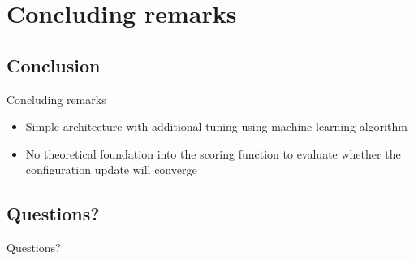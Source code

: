 \section{Concluding remarks}

\subsection{Conclusion}
\begin{frame}{Concluding remarks}
\begin{itemize}
    \item Simple architecture with additional tuning using machine learning algorithm
    \item No theoretical foundation into the scoring function to evaluate whether the configuration update will converge
\end{itemize}
\end{frame}

\subsection{Questions?}
\begin{frame}[label=questions]
Questions?

  \hyperlink{additional}{}
\end{frame}













